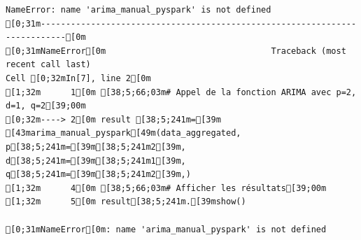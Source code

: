 \documentclass[
  letterpaper,
  DIV=11,
  numbers=noendperiod]{scrartcl}
\begin{document}
\begin{verbatim}
NameError: name 'arima_manual_pyspark' is not defined
[0;31m---------------------------------------------------------------------------[0m
[0;31mNameError[0m                                 Traceback (most recent call last)
Cell [0;32mIn[7], line 2[0m
[1;32m      1[0m [38;5;66;03m# Appel de la fonction ARIMA avec p=2, d=1, q=2[39;00m
[0;32m----> 2[0m result [38;5;241m=[39m [43marima_manual_pyspark[49m(data_aggregated, p[38;5;241m=[39m[38;5;241m2[39m, d[38;5;241m=[39m[38;5;241m1[39m, q[38;5;241m=[39m[38;5;241m2[39m,)
[1;32m      4[0m [38;5;66;03m# Afficher les résultats[39;00m
[1;32m      5[0m result[38;5;241m.[39mshow()

[0;31mNameError[0m: name 'arima_manual_pyspark' is not defined
\end{verbatim}
\end{document}
